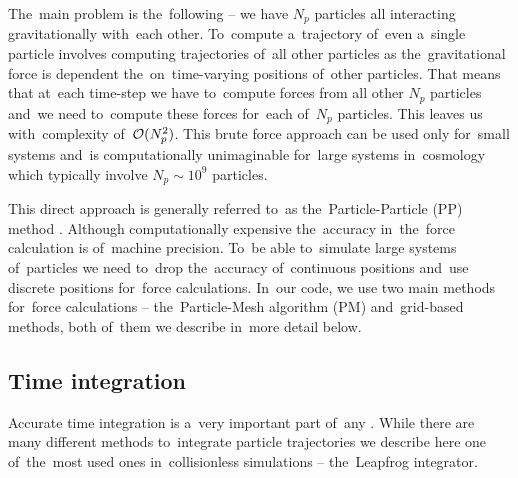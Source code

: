 The~main problem is the~following -- we have $N_p$ particles all interacting gravitationally with~each other. To~compute a~trajectory of~even a~single particle involves computing trajectories of~all other particles as the~gravitational force is dependent the~on~time-varying positions of~other particles. That means that at~each time-step we have to~compute forces from all other $N_p$ particles and~we need to~compute these forces for~each of~$N_p$ particles. This leaves us with~complexity of~\(\mathcal{O}(N_p^2)\). This brute force approach can be used only for~small systems and~is computationally unimaginable for~large systems in~cosmology which typically involve \(N_p\sim10^{9}\) particles.

This direct approach is generally referred to~as the~Particle-Particle (PP) method \parencite{Hockney:1988:CSU:62815}. Although computationally expensive the~accuracy in~the~force calculation is of~machine precision. To~be able to~simulate large systems of~particles we need to~drop the~accuracy of~continuous positions and~use discrete positions for~force calculations. In~our code, we use two main methods for~force calculations -- the~Particle-Mesh algorithm (PM) and~grid-based methods, both of~them we describe in~more detail below.
\subsection{Time integration}
Accurate time integration is a~very important part of~any \nbodysim. While there are many different methods to~integrate particle trajectories \parencite[see e.g.][]{Hockney:1988:CSU:62815} we describe here one of~the~most used ones in~collisionless simulations -- the~Leapfrog integrator.

